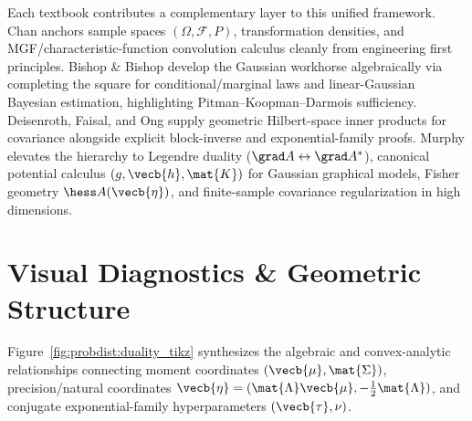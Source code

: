 \documentclass[../../../../master.tex]{subfiles}
\begin{document}
\begin{crossbook}
Each textbook contributes a complementary layer to this unified framework. Chan  anchors sample spaces $(\Omega,\mathcal{F},P)$, transformation densities, and MGF/characteristic-function convolution calculus cleanly from engineering first principles. Bishop \& Bishop  develop the Gaussian workhorse algebraically via completing the square for conditional/marginal laws and linear-Gaussian Bayesian estimation, highlighting Pitman--Koopman--Darmois sufficiency. Deisenroth, Faisal, and Ong  supply geometric Hilbert-space inner products for covariance alongside explicit block-inverse and exponential-family proofs. Murphy   elevates the hierarchy to Legendre duality ($\grad A \leftrightarrow \grad A^*$), canonical potential calculus $(g,\vecb{h},\mat{K})$ for Gaussian graphical models, Fisher geometry $\hess A(\vecb{\eta})$, and finite-sample covariance regularization in high dimensions.
\end{crossbook}

\section{Visual Diagnostics \& Geometric Structure}\label{sec:probdist:visuals}

Figure~\ref{fig:probdist:duality_tikz} synthesizes the algebraic and convex-analytic relationships connecting moment coordinates $(\vecb{\mu}, \mat{\Sigma})$, precision/natural coordinates $\vecb{\eta} = (\mat{\Lambda}\vecb{\mu}, -\tfrac{1}{2}\mat{\Lambda})$, and conjugate exponential-family hyperparameters $(\vecb{\tau}, \nu)$.
\end{document}

